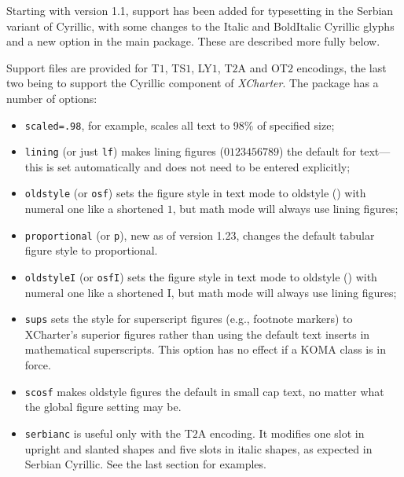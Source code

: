 \documentclass[11pt]{article}
\begin{document}
Starting with version 1.1, support has been added for typesetting in the Serbian variant of Cyrillic, with some changes to the Italic and BoldItalic Cyrillic glyphs and a new option in the main package. These are described more fully below.

Support files are provided for T$1$, TS$1$, LY$1$, T$2$A and OT$2$ encodings, the last two being to support the Cyrillic component of \emph{XCharter}. The package has  a number of options:
\begin{itemize}
\item
{\tt scaled=.98}, for example, scales all text to 98\% of specified size;
\item {\tt lining} (or just {\tt lf}) makes lining figures ($0123456789$) the default for text---this is set automatically and does not need to be entered explicitly;
\item {\tt oldstyle} (or {\tt osf}) sets the figure style in text mode to oldstyle ({}) with numeral one like a shortened  $1$, but math mode will always use lining figures;
\item {\tt proportional} (or {\tt p}), new as of version 1.23, changes the default tabular figure style to proportional.
\item {\tt oldstyleI} (or {\tt osfI}) sets the figure style in text mode to oldstyle ({}) with numeral one like a shortened I, but math mode will always use lining figures;
\item {\tt sups} sets the style for superscript figures (e.g., footnote markers) to XCharter's superior figures rather than using the default text inserts in mathematical superscripts. This option has no effect if a KOMA class is in force.
\item {\tt scosf} makes oldstyle figures the default in small cap text, no matter what the global figure setting may be.
\item {\tt serbianc} is useful only with the T$2$A encoding. It modifies
one slot in upright and slanted shapes and five slots in italic shapes, as expected in Serbian Cyrillic. See the last section for examples.
\end{itemize}
\end{document}

